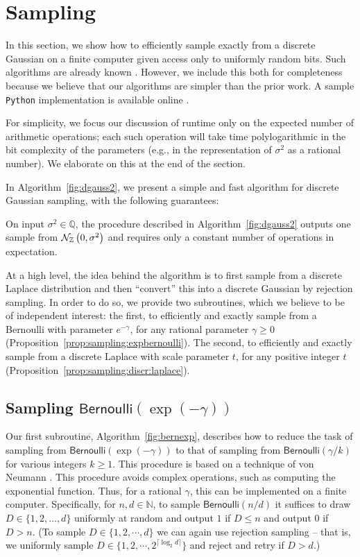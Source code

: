 \documentclass{jpc}
\newcommand{\dgausss}[2]{{\discN\left(#1,#2\right)}}
\newcommand{\dgauss}[1]{\dgausss{0}{#1}}
\newcommand{\bern}{\mathsf{Bernoulli}}
\begin{document}
\section{Sampling}
\label{sec:sampling}

In this section, we show how to efficiently sample exactly from a discrete Gaussian on a finite computer given access only to uniformly random bits. Such algorithms are already known \citep{Karney16,DuFW20}. However, we include this both for completeness because we believe that our algorithms are simpler than the prior work. A sample \texttt{Python} implementation is available online \citep{DGaussGithub}.

For simplicity, we focus our discussion of runtime only on the expected number of arithmetic operations; each such operation will take time polylogarithmic in the bit complexity of the parameters (e.g., in the representation of $\sigma^2$ as a rational number). We elaborate on this at the end of the section. 

In Algorithm~\ref{fig:dgauss2}, we present a simple and fast algorithm for discrete Gaussian sampling, with the following guarantees:
\begin{thm}
  \label{theo:sampling:discrete:gaussian}
  On input $\sigma^2\in\mathbb{Q}$, the procedure described in Algorithm~\ref{fig:dgauss2} outputs one sample from $\dgauss{\sigma^2}$ and requires only a constant number of  operations in expectation.
\end{thm}

At a high level, the idea behind the algorithm is to first sample from a discrete Laplace distribution and then ``convert'' this into a discrete Gaussian by rejection sampling. In order to do so, we provide two subroutines, which we believe to be of independent interest: the first, to efficiently and exactly sample from a Bernoulli with parameter $e^{-\gamma}$, for any rational parameter $\gamma \geq 0$ (Proposition~\ref{prop:sampling:expbernoulli}). The second, to efficiently and exactly sample from a discrete Laplace with scale parameter $t$, for any positive integer $t$ (Proposition~\ref{prop:sampling:discr:laplace}).

\subsection{Sampling $\bern(\exp(-\gamma))$}

Our first subroutine, Algorithm~\ref{fig:bernexp}, describes how to reduce the task of sampling from  $\bern(\exp(-\gamma))$ to that of sampling from $\bern(\gamma/k)$ for various integers $k \ge 1$. 
This procedure is based on a technique of von Neumann \citep{vonNeumann51,Forsythe72}. This procedure avoids complex operations, such as computing the exponential function. Thus, for a rational $\gamma$, this can be implemented on a finite computer. Specifically, for $n,d \in \mathbb{N}$, to sample $\bern(n/d)$ it suffices to draw $D \in \{1,2,\dots,d\}$ uniformly at random and output $1$ if $D \le n$ and output $0$ if $D > n$. (To sample $D \in \{1,2,\cdots,d\}$ we can again use rejection sampling -- that is, we uniformly sample $D \in \{1,2,\cdots,2^{\lceil \log_2 d \rceil}\}$ and reject and retry if $D>d$.)
\end{document}
